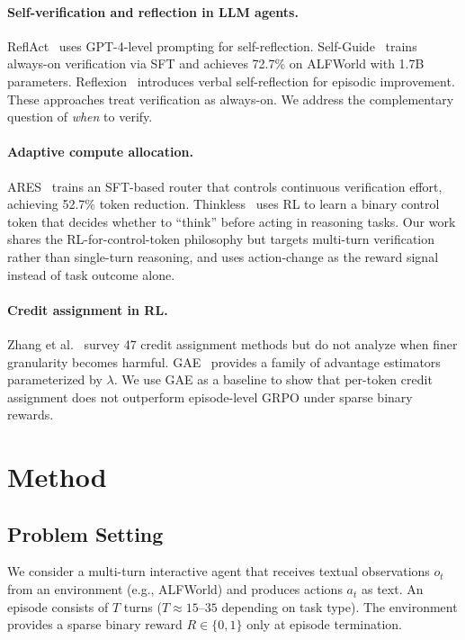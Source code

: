 \documentclass[10pt]{article}
\begin{document}
\paragraph{Self-verification and reflection in LLM agents.}
ReflAct~\citep{reflact} uses GPT-4-level prompting for self-reflection. Self-Guide~\citep{selfguide} trains always-on verification via SFT and achieves 72.7\% on ALFWorld with 1.7B parameters. Reflexion~\citep{reflexion} introduces verbal self-reflection for episodic improvement. These approaches treat verification as always-on. We address the complementary question of \emph{when} to verify.

\paragraph{Adaptive compute allocation.}
ARES~\citep{ares} trains an SFT-based router that controls continuous verification effort, achieving 52.7\% token reduction. Thinkless~\citep{thinkless} uses RL to learn a binary control token that decides whether to ``think'' before acting in reasoning tasks. Our work shares the RL-for-control-token philosophy but targets multi-turn verification rather than single-turn reasoning, and uses action-change as the reward signal instead of task outcome alone.

\paragraph{Credit assignment in RL.}
Zhang et al.~\citep{casurvey} survey 47 credit assignment methods but do not analyze when finer granularity becomes harmful. GAE~\citep{gae} provides a family of advantage estimators parameterized by $\lambda$. We use GAE as a baseline to show that per-token credit assignment does not outperform episode-level GRPO under sparse binary rewards.

\section{Method}

\subsection{Problem Setting}

We consider a multi-turn interactive agent that receives textual observations $o_t$ from an environment (e.g., ALFWorld) and produces actions $a_t$ as text. An episode consists of $T$ turns ($T{\approx}15$--$35$ depending on task type). The environment provides a sparse binary reward $R \in \{0, 1\}$ only at episode termination.
\end{document}

